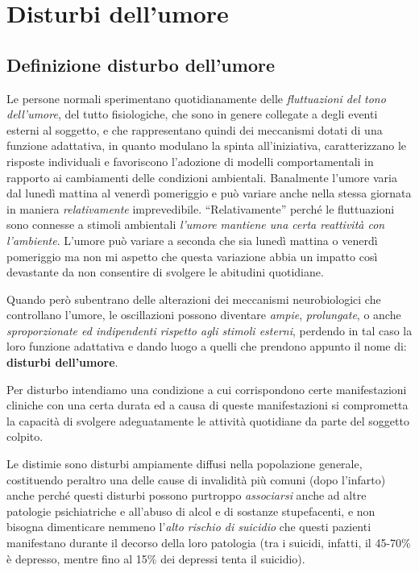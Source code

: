 \section{Disturbi dell'umore}

\subsection{Definizione disturbo dell'umore}

Le persone normali sperimentano quotidianamente delle \emph{fluttuazioni
del tono dell'umore}, del tutto fisiologiche, che sono in genere
collegate a degli eventi esterni al soggetto, e che rappresentano quindi
dei meccanismi dotati di una funzione adattativa, in quanto modulano la
spinta all'iniziativa, caratterizzano le risposte individuali e
favoriscono l'adozione di modelli comportamentali in rapporto ai
cambiamenti delle condizioni ambientali. Banalmente l'umore varia dal
lunedì mattina al venerdì pomeriggio e può variare anche nella stessa
giornata in maniera \emph{relativamente} imprevedibile.
``Relativamente'' perché le fluttuazioni sono connesse a stimoli
ambientali \emph{l'umore mantiene una certa reattività con l'ambiente}.
L'umore può variare a seconda che sia lunedì mattina o venerdì
pomeriggio ma non mi aspetto che questa variazione abbia un impatto così
devastante da non consentire di svolgere le abitudini quotidiane.

Quando però subentrano delle alterazioni dei meccanismi neurobiologici
che controllano l'umore, le oscillazioni possono diventare \emph{ampie},
\emph{prolungate}, o anche \emph{sproporzionate ed indipendenti rispetto
agli stimoli esterni}, perdendo in tal caso la loro funzione adattativa
e dando luogo a quelli che prendono appunto il nome di: \textbf{disturbi
dell'umore}.

Per disturbo intendiamo una condizione a cui corrispondono certe
manifestazioni cliniche con una certa durata ed a causa di queste
manifestazioni si comprometta la capacità di svolgere adeguatamente le
attività quotidiane da parte del soggetto colpito.

Le distimie sono disturbi ampiamente diffusi nella popolazione generale,
costituendo peraltro una delle cause di invalidità più comuni (dopo
l'infarto) anche perché questi disturbi possono purtroppo
\emph{associarsi} anche ad altre patologie psichiatriche e all'abuso di
alcol e di sostanze stupefacenti, e non bisogna dimenticare nemmeno
l'\emph{alto rischio di suicidio} che questi pazienti manifestano
durante il decorso della loro patologia (tra i suicidi, infatti, il
45-70\% è depresso, mentre fino al 15\% dei depressi tenta il suicidio).

